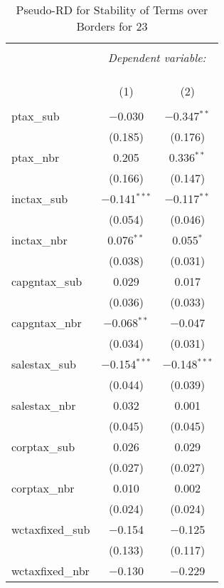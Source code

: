 
\begin{table}[!htbp] \centering 
  \caption{Pseudo-RD for Stability of Terms over Borders for  23} 
  \label{} 
\begin{tabular}{@{\extracolsep{5pt}}lcc} 
\\[-1.8ex]\hline 
\hline \\[-1.8ex] 
 & \multicolumn{2}{c}{\textit{Dependent variable:}} \\ 
\cline{2-3} 
\\[-1.8ex] & \multicolumn{2}{c}{ } \\ 
\\[-1.8ex] & (1) & (2)\\ 
\hline \\[-1.8ex] 
 ptax\_sub & $-$0.030 & $-$0.347$^{**}$ \\ 
  & (0.185) & (0.176) \\ 
  ptax\_nbr & 0.205 & 0.336$^{**}$ \\ 
  & (0.166) & (0.147) \\ 
  inctax\_sub & $-$0.141$^{***}$ & $-$0.117$^{**}$ \\ 
  & (0.054) & (0.046) \\ 
  inctax\_nbr & 0.076$^{**}$ & 0.055$^{*}$ \\ 
  & (0.038) & (0.031) \\ 
  capgntax\_sub & 0.029 & 0.017 \\ 
  & (0.036) & (0.033) \\ 
  capgntax\_nbr & $-$0.068$^{**}$ & $-$0.047 \\ 
  & (0.034) & (0.031) \\ 
  salestax\_sub & $-$0.154$^{***}$ & $-$0.148$^{***}$ \\ 
  & (0.044) & (0.039) \\ 
  salestax\_nbr & 0.032 & 0.001 \\ 
  & (0.045) & (0.045) \\ 
  corptax\_sub & 0.026 & 0.029 \\ 
  & (0.027) & (0.027) \\ 
  corptax\_nbr & 0.010 & 0.002 \\ 
  & (0.024) & (0.024) \\ 
  wctaxfixed\_sub & $-$0.154 & $-$0.125 \\ 
  & (0.133) & (0.117) \\ 
  wctaxfixed\_nbr & $-$0.130 & $-$0.229 \\ 

\end{tabular}
\end{table}
